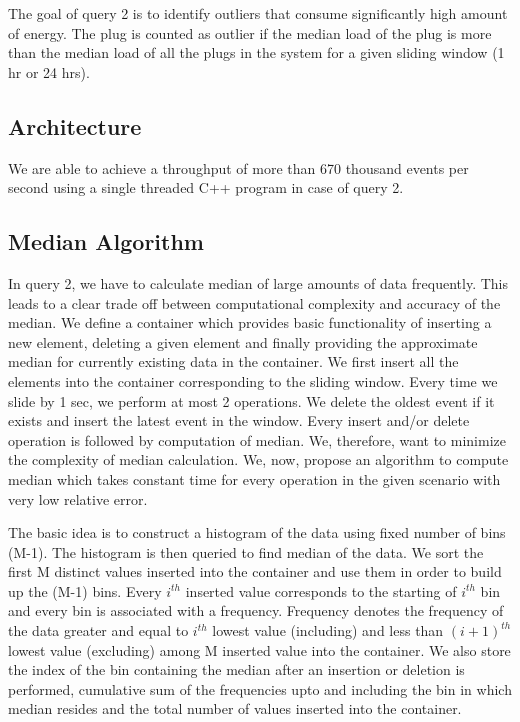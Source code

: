 The goal of query 2 is to identify outliers that consume significantly high amount of energy. The plug is counted as outlier if the median load of the plug is more than the median load of all the plugs in the system for a given sliding window (1 hr or 24 hrs).

\subsection{Architecture}
We are able to achieve a throughput of more than 670 thousand events per second using a single threaded C++ program in case of query 2.

\subsection{Median Algorithm}
In query 2, we have to calculate median of large amounts of data frequently. This leads to a clear trade off between computational complexity and accuracy of the median. We define a container which provides basic functionality of inserting a new element, deleting a given element and finally providing the approximate median for currently existing data in the container. We first insert all the elements into the container corresponding to the sliding window. Every time we slide by 1 sec, we perform at most 2 operations. We delete the oldest event if it exists and insert the latest event in the window. Every insert and/or delete operation is followed by computation of median. We, therefore, want to minimize the complexity of median calculation. We, now, propose an algorithm to compute median which takes constant time for every operation in the given scenario with very low relative error.

The basic idea is to construct a histogram of the data using fixed number of bins (M-1). The histogram is then queried to find median of the data. We sort the first M distinct values inserted into the container and use them in order to build up the (M-1) bins. Every $i^{th}$ inserted value corresponds to the starting of $i^{th}$ bin and every bin is associated with a frequency. Frequency denotes the frequency of the data greater and equal to $i^{th}$ lowest value (including) and less than $(i+1)^{th}$ lowest value (excluding) among M inserted value into the container. We also store the index of the bin containing the median after an insertion or deletion is performed, cumulative sum of the frequencies upto and including the bin in which median resides and the total number of values inserted into the container.


